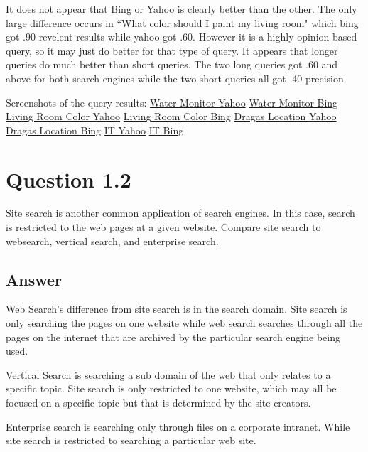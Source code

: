 \documentclass{article}
\begin{document}
It does not appear that Bing or Yahoo is clearly better than the other. The only large difference occurs in ``What color should I paint my living room" which bing 
got .90 revelent results while yahoo got .60. However it is a highly opinion based query, so it may just do better for that type of query. It appears that
longer queries do much better than short queries. The two long queries got .60 and above for both search engines while the two short queries all got .40 precision. 

Screenshots of the query results: 
\href{https://github.com/Miranda-C-Smith/cs834-f17/blob/master/assignments/length_asain_water_Monitor_YAHOO.PNG}{Water Monitor Yahoo}
\href{https://github.com/Miranda-C-Smith/cs834-f17/blob/master/assignments/length_asain_water_Monitor_BING.PNG}{Water Monitor Bing}
\href{https://github.com/Miranda-C-Smith/cs834-f17/blob/master/assignments/paint_Living_Room_YAHOO.PNG}{Living Room Color Yahoo}
\href{https://github.com/Miranda-C-Smith/cs834-f17/blob/master/assignments/paint_Living_Room_BING.PNG}{Living Room Color Bing}
\href{https://github.com/Miranda-C-Smith/cs834-f17/blob/master/assignments/dragas_hall_location_YAHOO.PNG}{Dragas Location Yahoo}
\href{https://github.com/Miranda-C-Smith/cs834-f17/blob/master/assignments/dragas_hall_location_BING.PNG}{Dragas Location Bing}
\href{https://github.com/Miranda-C-Smith/cs834-f17/blob/master/assignments/IT_YAHOO.PNG}{IT Yahoo}
\href{https://github.com/Miranda-C-Smith/cs834-f17/blob/master/assignments/IT_BING.PNG}{IT Bing}


\section{Question 1.2}

Site search is another common application of search engines. In this case, search is restricted to the web pages at a given website. Compare site search to websearch, vertical search, and enterprise search. 

\subsection*{Answer}

Web Search's difference from site search is in the search domain. Site search is only searching the pages on one website while web search searches through all the pages on the internet that are archived by the particular search engine being used.
\par
Vertical Search is searching a sub domain of the web that only relates to a specific topic. Site search is only restricted to one website, which may all be focused on a specific topic but that is determined by the site creators.
\par
Enterprise search is searching only through files on a corporate intranet. While site search is restricted to searching a particular web site.
\end{document}

